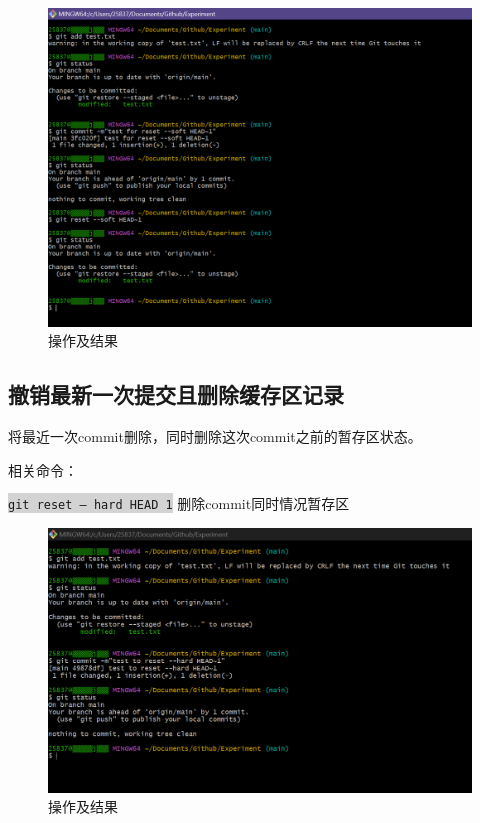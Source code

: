 \documentclass[a4paper, 12pt]{article}
\begin{document}
\begin{figure}[h!]
  \centering
  \includegraphics[width=1\textwidth]{im14}
  \caption{操作及结果}
  \label{image-myimage}
\end{figure}

\clearpage

  \subsection{撤销最新一次提交且删除缓存区记录}

将最近一次commit删除，同时删除这次commit之前的暂存区状态。

相关命令：

\colorbox{lightgray}{\texttt{git reset -- hard HEAD~1}} 删除commit同时情况暂存区

\begin{figure}[h!]
  \centering
  \includegraphics[width=1\textwidth]{im15}
  \caption{操作及结果}
  \label{image-myimage}
\end{figure}
\end{document}
